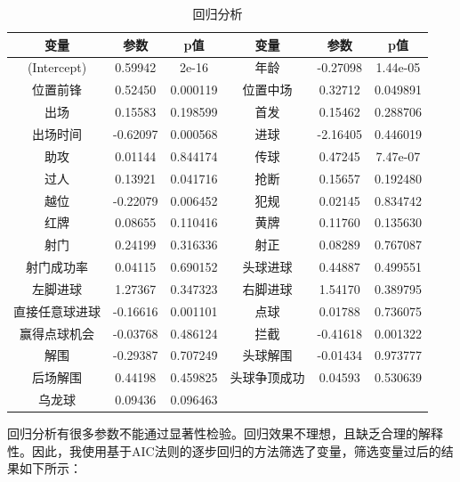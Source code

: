 \documentclass[12pt,a4paper,onecolumn]{article}
\begin{document}
\begin{table}[H]
\centering
\caption{回归分析}
\begin{tabular}{cccccc}
  \hline
	变量 &参数 &p值 &变量 &参数 &p值 \\\hline
 (Intercept) & 0.59942 & 2e-16 & 年龄 & -0.27098 & 1.44e-05\\
 位置前锋 & 0.52450 & 0.000119 & 位置中场 & 0.32712 & 0.049891\\
 出场 & 0.15583 & 0.198599 & 首发 & 0.15462 & 0.288706\\
 出场时间 & -0.62097 & 0.000568 & 进球 & -2.16405 & 0.446019\\
 助攻 & 0.01144 & 0.844174 & 传球 & 0.47245 & 7.47e-07\\
 过人 & 0.13921 & 0.041716 & 抢断 & 0.15657 & 0.192480\\
 越位 & -0.22079 & 0.006452 & 犯规 & 0.02145 & 0.834742\\
 红牌 & 0.08655 & 0.110416 & 黄牌 & 0.11760 & 0.135630\\
 射门 & 0.24199 & 0.316336 & 射正 & 0.08289 & 0.767087\\
 射门成功率 & 0.04115 & 0.690152 & 头球进球 & 0.44887 &0.499551  \\
 左脚进球 & 1.27367 & 0.347323 & 右脚进球 & 1.54170 & 0.389795    \\
 直接任意球进球 & -0.16616 & 0.001101 & 点球 & 0.01788 & 0.736075    \\
 赢得点球机会 & -0.03768 & 0.486124 & 拦截 & -0.41618 & 0.001322 \\
 解围 & -0.29387 & 0.707249 & 头球解围 & -0.01434 & 0.973777    \\
 后场解围 & 0.44198 & 0.459825 & 头球争顶成功 & 0.04593 & 0.530639    \\
 乌龙球 & 0.09436 & 0.096463 & & &\\
  \hline
  \end{tabular}
\end{table}

回归分析有很多参数不能通过显著性检验。回归效果不理想，且缺乏合理的解释性。因此，我使用基于AIC法则的逐步回归的方法筛选了变量，筛选变量过后的结果如下所示：
\end{document}
